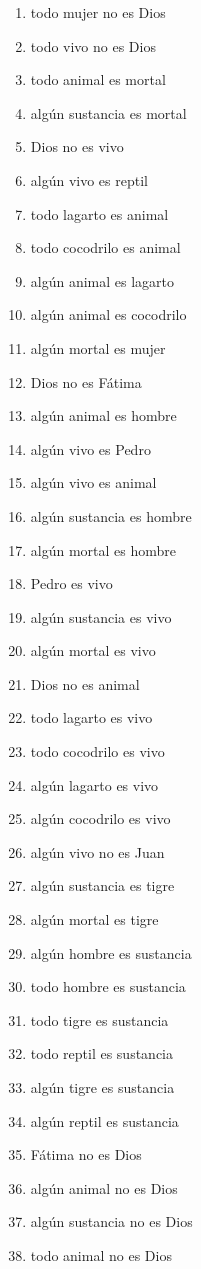 ﻿\documentclass[12pt]{book}
\begin{document}
\begin{enumerate}
\item todo mujer no es Dios
\item todo vivo no es Dios
\item todo animal es mortal
\item algún sustancia es mortal
\item Dios no es vivo
\item algún vivo es reptil
\item todo lagarto es animal
\item todo cocodrilo es animal
\item algún animal es lagarto
\item algún animal es cocodrilo
\item algún mortal es mujer
\item Dios no es Fátima
\item algún animal es hombre
\item algún vivo es Pedro
\item algún vivo es animal
\item algún sustancia es hombre
\item algún mortal es hombre
\item Pedro es vivo
\item algún sustancia es vivo
\item algún mortal es vivo
\item Dios no es animal
\item todo lagarto es vivo
\item todo cocodrilo es vivo
\item algún lagarto es vivo
\item algún cocodrilo es vivo
\item algún vivo no es Juan
\item algún sustancia es tigre
\item algún mortal es tigre
\item algún hombre es sustancia
\item todo hombre es sustancia
\item todo tigre es sustancia
\item todo reptil es sustancia
\item algún tigre es sustancia
\item algún reptil es sustancia
\item Fátima no es Dios
\item algún animal no es Dios
\item algún sustancia no es Dios
\item todo animal no es Dios

\end{enumerate}
\end{document}
